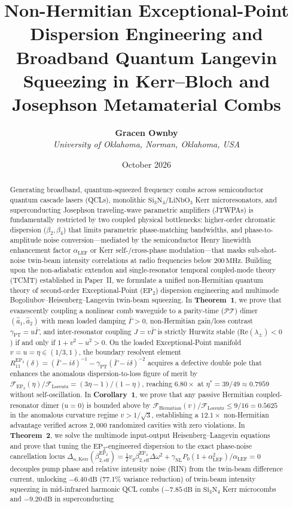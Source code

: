 \documentclass[11pt,letterpaper]{article}
\title{\textbf{Non-Hermitian Exceptional-Point Dispersion Engineering and Broadband Quantum Langevin Squeezing in Kerr--Bloch and Josephson Metamaterial Combs}}
\author{\textbf{Gracen Ownby}\\
\textit{University of Oklahoma, Norman, Oklahoma, USA}}
\date{October 2026}
\theoremstyle{definition}
\theoremstyle{remark}
\begin{document}
\maketitle

\begin{abstract}
Generating broadband, quantum-squeezed frequency combs across semiconductor quantum cascade lasers (QCLs), monolithic $\mathrm{Si_3N_4}/\mathrm{LiNbO_3}$ Kerr microresonators, and superconducting Josephson traveling-wave parametric amplifiers (JTWPAs) is fundamentally restricted by two coupled physical bottlenecks: higher-order chromatic dispersion ($\beta_2, \beta_4$) that limits parametric phase-matching bandwidths, and phase-to-amplitude noise conversion—mediated by the semiconductor Henry linewidth enhancement factor $\alpha_{\mathrm{LEF}}$ or Kerr self-/cross-phase modulation—that masks sub-shot-noise twin-beam intensity correlations at radio frequencies below $200\,\mathrm{MHz}$. Building upon the non-adiabatic extendon and single-resonator temporal coupled-mode theory (TCMT) established in Paper~II, we formulate a unified non-Hermitian quantum theory of second-order Exceptional-Point ($\mathrm{EP}_2$) dispersion engineering and multimode Bogoliubov--Heisenberg--Langevin twin-beam squeezing. In \textbf{Theorem~1}, we prove that evanescently coupling a nonlinear comb waveguide to a parity-time ($\mathcal{PT}$) dimer $(\hat{a}_1, \hat{a}_2)$ with mean loaded damping $\bar{\Gamma} > 0$, non-Hermitian gain/loss contrast $\gamma_{\mathrm{PT}} = u\bar{\Gamma}$, and inter-resonator coupling $J = v\bar{\Gamma}$ is strictly Hurwitz stable ($\mathrm{Re}(\lambda_\pm) < 0$) if and only if $1 + v^2 - u^2 > 0$. On the loaded Exceptional-Point manifold $v = u = \eta \in (1/3, 1)$, the boundary resolvent element $R_{11}^{\mathrm{EP}_2}(\delta) = (\bar{\Gamma} - i\delta)^{-1} - \gamma_{\mathrm{PT}}(\bar{\Gamma} - i\delta)^{-2}$ acquires a defective double pole that enhances the anomalous dispersion-to-loss figure of merit by $\mathcal{F}_{\mathrm{EP}_2}(\eta)/\mathcal{F}_{\mathrm{Lorentz}} = (3\eta - 1)/(1 - \eta)$, reaching $6.80\times$ at $\eta^* = 39/49 \approx 0.7959$ without self-oscillation. In \textbf{Corollary~1}, we prove that any passive Hermitian coupled-resonator dimer ($u = 0$) is bounded above by $\mathcal{F}_{\mathrm{Hermitian}}(v)/\mathcal{F}_{\mathrm{Lorentz}} \le 9/16 = 0.5625$ in the anomalous curvature regime $v > 1/\sqrt{3}$, establishing a $12.1\times$ non-Hermitian advantage verified across $2{,}000$ randomized cavities with zero violations. In \textbf{Theorem~2}, we solve the multimode input-output Heisenberg--Langevin equations and prove that tuning the $\mathrm{EP}_2$-engineered dispersion to the exact phase-noise cancellation locus $\Delta_{\alpha,\mathrm{Kerr}}(\beta_{2,\mathrm{eff}}^{\mathrm{EP}_2}) = \frac{1}{2}v_g\beta_{2,\mathrm{eff}}^{\mathrm{EP}_2}\Delta\omega^2 + \gamma_{\mathrm{NL}}P_0(1 + \alpha_{\mathrm{LEF}}^2)/\alpha_{\mathrm{LEF}} = 0$ decouples pump phase and relative intensity noise (RIN) from the twin-beam difference current, unlocking $-6.40\,\mathrm{dB}$ ($77.1\%$ variance reduction) of twin-beam intensity squeezing in mid-infrared harmonic QCL combs ($-7.85\,\mathrm{dB}$ in $\mathrm{Si_3N_4}$ Kerr microcombs and $-9.20\,\mathrm{dB}$ in superconducting 
\end{abstract}
\end{document}
